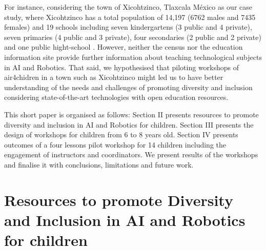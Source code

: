 \documentclass[conference]{IEEEtran}
\begin{document}
For instance, considering the town of Xicohtzinco, Tlaxcala M\'exico as our case study, where Xicohtzinco has a total population of 14,197 (6762 males and 7435 females) \cite{inegi2022} and 19 schools including seven kindergartens (3 public and 4 private), seven primaries (4 public and 3 private), four secondaries (2 public and 2 private) and one public hight-school \cite{siged2022}.
However, neither the census \cite{inegi2022} nor the education information site \cite{siged2022} provide further information about teaching technological subjects in AI and Robotics.
That said, we hypothesised that piloting workshops of air4chidren in a town such as Xicohtzinco might led us to have better understanding of the needs and challenges of promoting diversity and inclusion considering state-of-the-art technologies with open education resources.

This short paper is organised as follows:
Section II presents resources to promote diversity and inclusion in AI and Robotics for children.
Section III presents the design of workshops for children from 6 to 8 years old.
Section IV presents outcomes of a four lessons pilot workshop for 14 children including the engagement of instructors and coordinators. 
We present results of the workshops and finalise it with conclusions, limitations and future work.


\section{Resources to promote Diversity and Inclusion in AI and Robotics for children}
\end{document}
